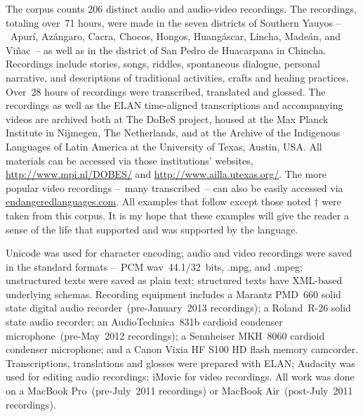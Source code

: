 The corpus counts 206 distinct audio and audio-video recordings. The recordings, totaling over~71 hours, were made in the seven districts of Southern Yauyos --~Apurí, Azángaro, Cacra, Chocos, Hongos, Hu\-angáscar, Lincha, Madeán, and Viñac~-- as well as in the district of San Pedro de Huacarpana in Chincha. Recordings include stories, songs, riddles, spontaneous dialogue, personal narrative, and descriptions of traditional activities, crafts and healing practices. Over~28 hours of recordings were transcribed, translated and glossed. The recordings as well as the ELAN time-aligned transcriptions and accompanying videos are archived both at The DoBeS project, housed at the Max Planck Institute in Nijmegen, The Netherlands, and at the Archive of the Indigenous Languages of Latin America at the University of Texas, Austin, USA. All materials can be accessed via those institutions’ websites, \url{http://www.mpi.nl/DOBES/} and \url{http://www.ailla.utexas.org/}. The more popular video recordings --~many transcribed~-- can also be easily accessed via \url{endangeredlanguages.com}. All examples that follow except those noted † were taken from this corpus. It is my hope that these examples will give the reader a sense of the life that supported and was supported by the language. 

Unicode was used for character encoding; audio and video recordings were saved in the standard formats --~PCM \textrm{wav}~44.1/32~bits, \textrm{.mpg}, and \textrm{.mpeg}; unstructured texts were saved as plain text; structured texts have XML-based underlying schemas. Recording equipment includes a Marantz PMD~660 solid state digital audio recorder~(pre-January~2013 recordings); a Roland~R-26 solid state audio recorder; an AudioTechnica~831b cardioid condenser microphone~(pre-May~2012 recordings); a Sennheiser MKH~8060 cardioid condenser microphone; and a Canon Vixia HF S100 HD flash memory camcorder. Transcriptions, translations and glosses were prepared with ELAN; Audacity was used for editing audio recordings; iMovie for video recordings. All work was done on a MacBook Pro~(pre-July~2011 recordings) or MacBook Air~(post-July~2011 recordings). 

